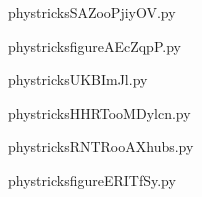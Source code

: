     \newcommand{\CaptionFigSAZooPjiyOV}{<+Type your caption here+>}
    \begin{center}
        
    \end{center}
    phystricksSAZooPjiyOV.py

    

    \clearpage
    


    \newcommand{\CaptionFigfigureAEcZqpP}{<+Type your caption here+>}
    \begin{center}
        
    \end{center}
    phystricksfigureAEcZqpP.py

    

    \clearpage
    


    \newcommand{\CaptionFigUKBImJl}{<+Type your caption here+>}
    \begin{center}
        
    \end{center}
    phystricksUKBImJl.py

    

    \clearpage
    


    \newcommand{\CaptionFigHHRTooMDylcn}{<+Type your caption here+>}
    \begin{center}
        
    \end{center}
    phystricksHHRTooMDylcn.py

    

    \clearpage
    


    \newcommand{\CaptionFigRNTRooAXhubs}{<+Type your caption here+>}
    \begin{center}
        
    \end{center}
    phystricksRNTRooAXhubs.py

    

    \clearpage
    


    \newcommand{\CaptionFigfigureERITfSy}{<+Type your caption here+>}
    \begin{center}
        
    \end{center}
    phystricksfigureERITfSy.py

